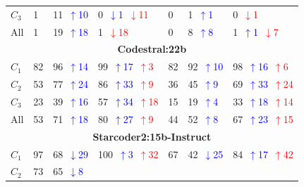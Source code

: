\begin{table}
\begin{tabularx}{\textwidth}{l X X X X X X}
$C_3$ 
& 1 
& 11~\textcolor{blue}{\scriptsize$\uparrow$10}   
& 0~\textcolor{blue}{\scriptsize$\downarrow$1}~\textcolor{red}{\scriptsize$\downarrow$11}
& 0 
& 1~\textcolor{blue}{\scriptsize$\uparrow$1}   
& 0~\textcolor{red}{\scriptsize$\downarrow$1}   \\
All 
& 1 
& 19~\textcolor{blue}{\scriptsize$\uparrow$18}   
& 1~\textcolor{red}{\scriptsize$\downarrow$18}
& 0 
& 8~\textcolor{blue}{\scriptsize$\uparrow$8}   
& 1~\textcolor{blue}{\scriptsize$\uparrow$1}~\textcolor{red}{\scriptsize$\downarrow$7} \\
\midrule
\multicolumn{7}{c}{\small\textbf{Codestral:22b}} \\
\midrule
$C_1$ 
& 82 
& 96~\textcolor{blue}{\scriptsize$\uparrow$14}   
& 99~\textcolor{blue}{\scriptsize$\uparrow$17}~\textcolor{red}{\scriptsize$\uparrow$3}
& 82 
& 92~\textcolor{blue}{\scriptsize$\uparrow$10}   
& 98~\textcolor{blue}{\scriptsize$\uparrow$16}~\textcolor{red}{\scriptsize$\uparrow$6} \\
$C_2$ 
& 53 
& 77~\textcolor{blue}{\scriptsize$\uparrow$24}   
& 86~\textcolor{blue}{\scriptsize$\uparrow$33}~\textcolor{red}{\scriptsize$\uparrow$9}
& 36 
& 45~\textcolor{blue}{\scriptsize$\uparrow$9}   
& 69~\textcolor{blue}{\scriptsize$\uparrow$33}~\textcolor{red}{\scriptsize$\uparrow$24} \\
$C_3$ 
& 23 
& 39~\textcolor{blue}{\scriptsize$\uparrow$16}   
& 57~\textcolor{blue}{\scriptsize$\uparrow$34}~\textcolor{red}{\scriptsize$\uparrow$18}
& 15 
& 19~\textcolor{blue}{\scriptsize$\uparrow$4}   
& 33~\textcolor{blue}{\scriptsize$\uparrow$18}~\textcolor{red}{\scriptsize$\uparrow$14} \\
All 
& 53 
& 71~\textcolor{blue}{\scriptsize$\uparrow$18}   
& 80~\textcolor{blue}{\scriptsize$\uparrow$27}~\textcolor{red}{\scriptsize$\uparrow$9}
& 44 
& 52~\textcolor{blue}{\scriptsize$\uparrow$8}   
& 67~\textcolor{blue}{\scriptsize$\uparrow$23}~\textcolor{red}{\scriptsize$\uparrow$15} \\
\midrule
\multicolumn{7}{c}{\small\textbf{Starcoder2:15b-Instruct}} \\
\midrule
$C_1$ 
& 97 
& 68~\textcolor{blue}{\scriptsize$\downarrow$29}   
& 100~\textcolor{blue}{\scriptsize$\uparrow$3}~\textcolor{red}{\scriptsize$\uparrow$32}
& 67 
& 42~\textcolor{blue}{\scriptsize$\downarrow$25}   
& 84~\textcolor{blue}{\scriptsize$\uparrow$17}~\textcolor{red}{\scriptsize$\uparrow$42} \\
$C_2$ 
& 73 
& 65~\textcolor{blue}{\scriptsize$\downarrow$8}   

\end{tabularx}
\end{table}
